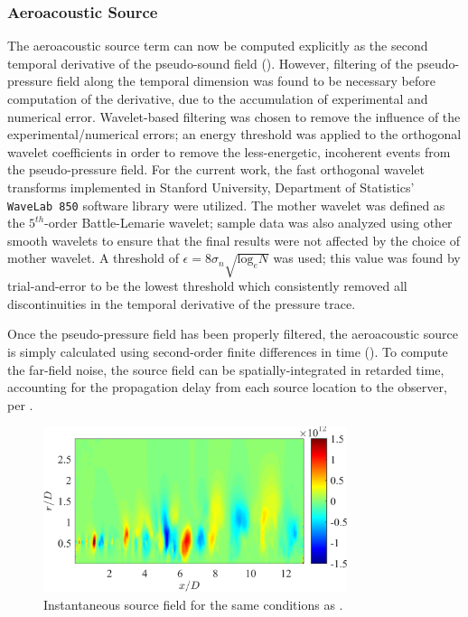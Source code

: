 \subsubsection{Aeroacoustic Source}
The aeroacoustic source term can now be computed explicitly as the second temporal derivative of the pseudo-sound field ().
However, filtering of the pseudo-pressure field along the temporal dimension was found to be necessary before computation of the derivative, due to the accumulation of experimental and numerical error.
Wavelet-based filtering was chosen to remove the influence of the experimental/numerical errors; an energy threshold was applied to the orthogonal wavelet coefficients in order to remove the less-energetic, incoherent events from the pseudo-pressure field.
For the current work, the fast orthogonal wavelet transforms implemented in Stanford University, Department of Statistics' \texttt{WaveLab 850} software library were utilized.
The mother wavelet was defined as the $5^{th}$-order Battle-Lemarie wavelet; sample data was also analyzed using other smooth wavelets to ensure that the final results were not affected by the choice of mother wavelet.
A threshold of $\epsilon = 8 \sigma_n \sqrt{ \mathrm{log}_e N}$ was used; this value was found by trial-and-error to be the lowest threshold which consistently removed all discontinuities in the temporal derivative of the pressure trace.

Once the pseudo-pressure field has been properly filtered, the aeroacoustic source is simply calculated using second-order finite differences in time ().
To compute the far-field noise, the source field can be spatially-integrated in retarded time, accounting for the propagation delay from each source location to the observer, per . 
\begin{figure}
	\centering
	\includegraphics[width = 3.5in]{Figures/ch5_valid_Inst_source.png}
	\caption{Instantaneous source field for the same conditions as .}
	\label{fig:valid_source}
\end{figure}

